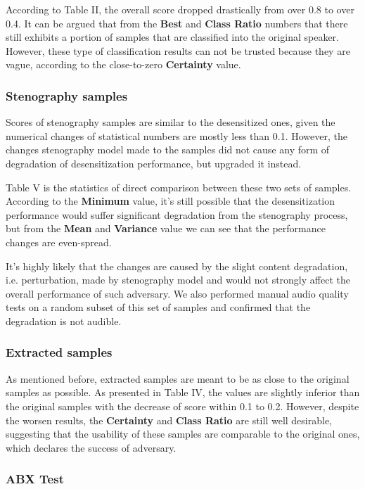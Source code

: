 \documentclass[conference]{IEEEtran}
\begin{document}
According to Table II, the overall score dropped drastically from over 0.8 to over 0.4. It can be argued that from the \textbf{Best} and \textbf{Class Ratio} numbers that there still exhibits a portion of samples that are classified into the original speaker. However, these type of classification results can not be trusted because they are vague, according to the close-to-zero \textbf{Certainty} value.

\subsubsection{Stenography samples}

Scores of stenography samples are similar to the desensitized ones, given the numerical changes of statistical numbers are mostly less than 0.1. However, the changes stenography model made to the samples did not cause any form of degradation of desensitization performance, but upgraded it instead.

Table V is the statistics of direct comparison between these two sets of samples. According to the \textbf{Minimum} value, it's still possible that the desensitization performance would suffer significant degradation from the stenography process, but from the \textbf{Mean} and \textbf{Variance} value we can see that the performance changes are even-spread.

It's highly likely that the changes are caused by the slight content degradation, i.e. perturbation, made by stenography model and would not strongly affect the overall performance of such adversary. We also performed manual audio quality tests on a random subset of this set of samples and confirmed that the degradation is not audible.

\subsubsection{Extracted samples}

As mentioned before, extracted samples are meant to be as close to the original samples as possible. As presented in Table IV, the values are slightly inferior than the original samples with the decrease of score within 0.1 to 0.2. However, despite the worsen results, the \textbf{Certainty} and \textbf{Class Ratio} are still well desirable, suggesting that the usability of these samples are comparable to the original ones, which declares the success of adversary.

\subsubsection{ABX Test}
\end{document}
